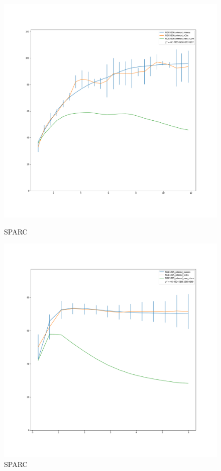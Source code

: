 \documentclass[reprint,%
 amsmath,amssymb,
 aps,
]{revtex4-1}
\begin{document}
\begin{figure} 
\centering
\begin{minipage}{0.5\textwidth}
  \includegraphics[width=.8\linewidth]{figures/NGC0300_rotmod_XueSofue.png}
\caption{ SPARC\cite{2016Lelli}}
\label{fig:2841}
\end{minipage}
\begin{minipage}{0.5\textwidth}
  \includegraphics[width=.8\linewidth]{figures/NGC1705_rotmod_XueSofue.png}
\caption{ SPARC\cite{2016Lelli}}
\label{fig:2915}
\end{minipage}
\end{figure}
\end{document}
